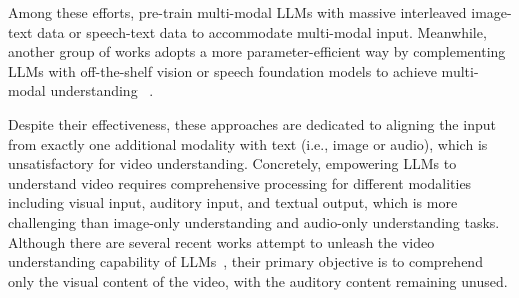 Among these efforts, \citet{alayrac2022flamingoav,wang2022ofa,huang2023languagein,xu2023mplug2,zhang2023speechgpt,sun2023generative} pre-train multi-modal LLMs with massive interleaved image-text data or speech-text data to accommodate multi-modal input. Meanwhile, another group of works adopts a more parameter-efficient way by complementing LLMs with off-the-shelf vision or speech foundation models to achieve multi-modal understanding ~\citep{li2023blip2bl,zhu2023minigpt,liu2023visualit,ye2023mplugowl,zhang2023vpgtrans,huang2023audiogpt,wu2023onda,pandagpt,li2023otter}. 

Despite their effectiveness, these approaches are dedicated to aligning the input from exactly one additional modality with text (i.e., image or audio), which is unsatisfactory for video understanding. Concretely, empowering LLMs to understand video requires comprehensive processing  for different modalities including visual input, auditory input, and textual output, which is more challenging than image-only understanding and audio-only understanding tasks.
Although there are several recent works attempt to unleash the video understanding capability of LLMs~\citep{li2023videochatcv,maaz2023videochatgpt,luo2023valley}, their primary objective is to comprehend only the visual content of the video, with the auditory content remaining unused.

\begin{table}[t!]
\centering
{}
\caption{Comparison with popular multi-modal large language models. Video-LLaMA has the unique ability to comprehend auditory and visual information simultaneously.}
\label{tab.comparison}
\end{table}

